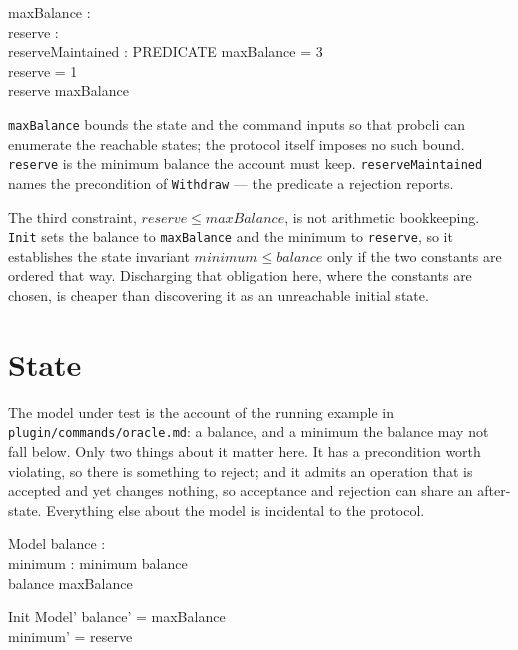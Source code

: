 \documentclass[a4paper,10pt,fleqn]{article}
\begin{document}
\begin{axdef}
  maxBalance : \nat \\
  reserve : \nat \\
  reserveMaintained : PREDICATE
  \where
  maxBalance = 3 \\
  reserve = 1 \\
  reserve \leq maxBalance
\end{axdef}

\texttt{maxBalance} bounds the state and the command inputs so that
probcli can enumerate the reachable states; the protocol itself imposes
no such bound. \texttt{reserve} is the minimum balance the account must
keep. \texttt{reserveMaintained} names the precondition of
\texttt{Withdraw} --- the predicate a rejection reports.

The third constraint, $reserve \leq maxBalance$, is not arithmetic
bookkeeping. \texttt{Init} sets the balance to \texttt{maxBalance} and
the minimum to \texttt{reserve}, so it establishes the state invariant
$minimum \leq balance$ only if the two constants are ordered that way.
Discharging that obligation here, where the constants are chosen, is
cheaper than discovering it as an unreachable initial state.

\section{State}

The model under test is the account of the running example in
\texttt{plugin/commands/oracle.md}: a balance, and a minimum the balance may not
fall below. Only two things about it matter here. It has a precondition
worth violating, so there is something to reject; and it admits an
operation that is accepted and yet changes nothing, so acceptance and
rejection can share an after-state. Everything else about the model is
incidental to the protocol.

\begin{schema}{Model}
  balance : \nat \\
  minimum : \nat
  \where
  minimum \leq balance \\
  balance \leq maxBalance
\end{schema}

\begin{schema}{Init}
  Model'
  \where
  balance' = maxBalance \\
  minimum' = reserve
\end{schema}
\end{document}
